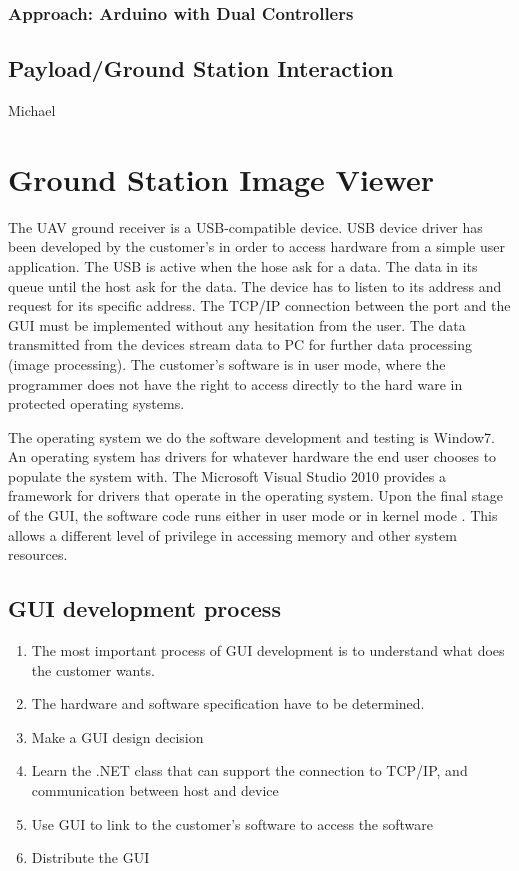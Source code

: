 \documentclass[oneside]{ecsgdp}         %
\begin{document}
\subsubsection{Approach: Arduino with Dual Controllers}



\subsection{Payload/Ground Station Interaction}
Michael


\section{Ground Station Image Viewer}
The UAV ground receiver is a USB-compatible device. USB device driver has been developed by the customer’s in order to access hardware from a simple user application. The USB is active when the hose ask for a data. The data in its queue until the host ask for the data. The device has to listen to its address and request for its specific address. The TCP/IP connection between the port and the GUI must be implemented without any hesitation from the user. The data transmitted from the devices stream data to PC for further data processing (image processing).  The customer’s software is in user mode, where the programmer does not have the right to access directly to the hard ware in protected operating systems. 

The operating system we do the software development and testing is Window7. An operating system has drivers for whatever hardware the end user chooses to populate the system with. The Microsoft Visual Studio 2010 provides a framework for drivers that operate in the operating system. Upon the final stage of the GUI, the software code runs either in user mode or in kernel mode \cite{tsuiK}. This allows a different level of privilege in accessing memory and other system resources. 
\subsection{GUI development process} 
\flushleft
\begin{enumerate}


\item	The most important process of GUI development is to understand what does the customer wants. 

\item	The hardware and software specification have to be determined.
 
\item	Make a GUI design decision

\item	Learn the .NET class that can support the connection to TCP/IP, and communication between host and device

\item	Use GUI to link to the customer’s software to access the software

\item	Distribute the GUI
\end{enumerate}
\end{document}
